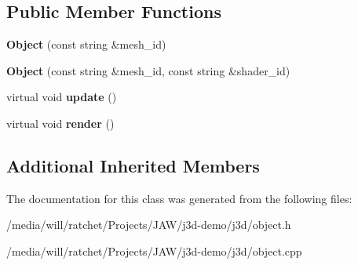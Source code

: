 \subsection*{Public Member Functions}
\begin{DoxyCompactItemize}
\item 
\hypertarget{classj3d_1_1Object_a7dcade6be931c20e74a3e1ff1cb52b4f}{}{\bfseries Object} (const string \&mesh\+\_\+id)\label{classj3d_1_1Object_a7dcade6be931c20e74a3e1ff1cb52b4f}

\item 
\hypertarget{classj3d_1_1Object_a6d2910f06b85e547eac3b6b4842af9dc}{}{\bfseries Object} (const string \&mesh\+\_\+id, const string \&shader\+\_\+id)\label{classj3d_1_1Object_a6d2910f06b85e547eac3b6b4842af9dc}

\item 
\hypertarget{classj3d_1_1Object_a4abd48bacb1b004c8ac891597c831f77}{}virtual void {\bfseries update} ()\label{classj3d_1_1Object_a4abd48bacb1b004c8ac891597c831f77}

\item 
\hypertarget{classj3d_1_1Object_ae0e92359520b9a848f45efdd86485552}{}virtual void {\bfseries render} ()\label{classj3d_1_1Object_ae0e92359520b9a848f45efdd86485552}

\end{DoxyCompactItemize}
\subsection*{Additional Inherited Members}


The documentation for this class was generated from the following files\+:\begin{DoxyCompactItemize}
\item 
/media/will/ratchet/\+Projects/\+J\+A\+W/j3d-\/demo/j3d/object.\+h\item 
/media/will/ratchet/\+Projects/\+J\+A\+W/j3d-\/demo/j3d/object.\+cpp\end{DoxyCompactItemize}
